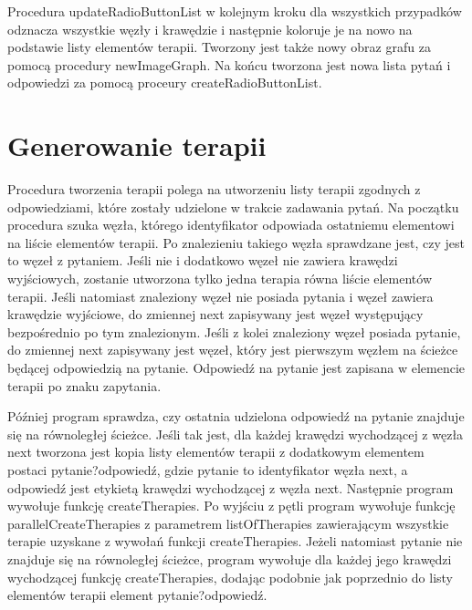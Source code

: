 Procedura updateRadioButtonList w kolejnym kroku dla wszystkich
 przypadków odznacza wszystkie węzły i krawędzie i następnie koloruje je na nowo na podstawie listy elementów terapii. Tworzony jest także nowy obraz grafu za pomocą procedury newImageGraph. Na końcu tworzona jest nowa lista pytań i odpowiedzi za pomocą proceury createRadioButtonList. 

\section{Generowanie terapii}

Procedura tworzenia terapii polega na utworzeniu listy terapii zgodnych z odpowiedziami, które zostały udzielone w trakcie zadawania pytań. Na początku procedura szuka węzła, którego identyfikator odpowiada ostatniemu elementowi na liście elementów terapii. Po znalezieniu takiego węzła sprawdzane jest, czy jest to węzeł z pytaniem. Jeśli nie i dodatkowo węzeł nie zawiera krawędzi wyjściowych, zostanie utworzona tylko jedna terapia równa liście elementów terapii. Jeśli natomiast znaleziony węzeł nie posiada pytania i węzeł zawiera krawędzie wyjściowe, do zmiennej next zapisywany jest węzeł występujący bezpośrednio po tym znalezionym. Jeśli z kolei znaleziony węzeł posiada pytanie, do zmiennej next zapisywany jest węzeł, który jest pierwszym węzłem na ścieżce będącej odpowiedzią na pytanie. Odpowiedź na pytanie jest zapisana w elemencie terapii po znaku zapytania.

Później program sprawdza, czy ostatnia udzielona odpowiedź na pytanie znajduje się na równoległej ścieżce. Jeśli tak jest, dla każdej krawędzi wychodzącej z węzła next tworzona jest kopia listy elementów terapii z dodatkowym elementem postaci pytanie?odpowiedź, gdzie pytanie to identyfikator węzła next, a odpowiedź jest etykietą krawędzi wychodzącej z węzła next. 
Następnie program wywołuje funkcję createTherapies. Po wyjściu z pętli program wywołuje funkcję parallelCreateTherapies z parametrem listOfTherapies zawierającym wszystkie terapie uzyskane z wywołań funkcji createTherapies. Jeżeli natomiast pytanie nie znajduje się na równoległej ścieżce, program wywołuje dla każdej jego krawędzi wychodzącej funkcję createTherapies, dodając podobnie jak poprzednio do listy elementów terapii element pytanie?odpowiedź. 

